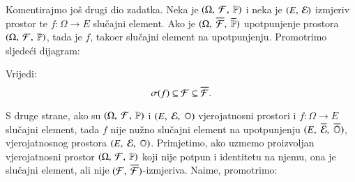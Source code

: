 \begin{rj}[\ref{zad:3.10}]
    Komentirajmo jo\v s drugi dio zadatka.
    Neka je $(\Omega, \: \mathcal{F}, \: \mathbb{P})$ i neka je $({E}, \: {\mathcal{E}})$ izmjeriv prostor te $f: \Omega \to E$ slu\v cajni element.
    Ako je $(\Omega, \; \overline{\mathcal{F}}, \; \overline{\mathbb{P}})$ upotpunjenje prostora $(\Omega, \: \mathcal{F}, \: \mathbb{P})$, tada je $f$, tako\dj er slu\v cajni element na upotpunjenju.
    Promotrimo sljede\' ci dijagram:
    \begin{figure}[H]
        \centering
    \end{figure}
    Vrijedi:
    \begin{equation*}
        \sigma({f}) \subseteq \mathcal{F} \subseteq \overline{\mathcal{F}}.
    \end{equation*}

    S druge strane, ako su $(\Omega, \: \mathcal{F}, \: \mathbb{P})$ i $(E, \; \mathcal{E}, \; \mathbb{O})$ vjerojatnosni prostori i $f: \Omega \to E$ slu\v cajni element, tada $f$ nije nu\v zno slu\v cajni element na upotpunjenju $(E, \; \overline{\mathcal{E}}, \; \overline{\mathbb{O}})$, vjerojatnosnog prostora $(E, \; \mathcal{E}, \; \mathbb{O})$.
    Primjetimo, ako uzmemo proizvoljan vjerojatnosni prostor $(\Omega, \: \mathcal{F}, \: \mathbb{P})$ koji nije potpun i identitetu na njemu, ona je slu\v cajni element, ali nije $({\mathcal{F}}, \: {\overline{\mathcal{F}}})$-izmjeriva.
    Naime, promotrimo:
    \begin{figure}[H]
        \centering
    \end{figure}
\end{rj}

